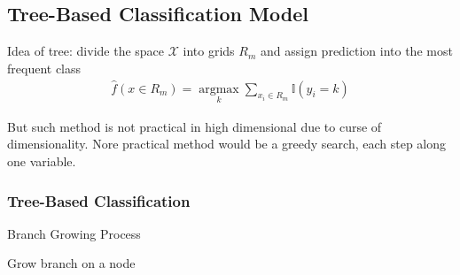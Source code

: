 \subsection{Tree-Based Classification Model}
    Idea of tree: divide the space $ \mathcal{X} $ into grids $ R_m $ and assign prediction into the most frequent class
    \begin{align}
        \hat{f}(x\in R_m)=\mathop{\arg\max}\limits_{k} \sum_{x_i\in R_m}\mathbb{I}(y_i=k)
    \end{align}

    But such method is not practical in high dimensional due to curse of dimensionality. Nore practical method would be a greedy search, each step along one variable.

\subsubsection{Tree-Based Classification}

\begin{point}
    Branch Growing Process
\end{point}

    Grow branch on a node $  $

